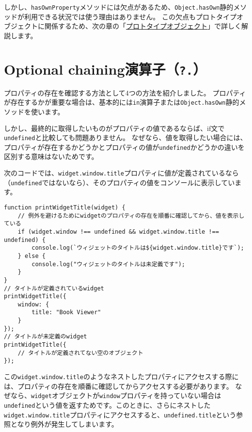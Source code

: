 しかし、\texttt{hasOwnProperty}メソッドには欠点があるため、\texttt{Object.hasOwn}静的メソッドが利用できる状況では使う理由はありません。
この欠点もプロトタイプオブジェクトに関係するため、次の章の「\hyperlink{prototype-object}{プロトタイプオブジェクト}」で詳しく解説します。

\hypertarget{optional-chaining-operator}{%
\section{Optional chaining演算子（\texttt{?.}）\,\protect{}}\label{optional-chaining-operator}}

プロパティの存在を確認する方法として4つの方法を紹介しました。
プロパティが存在するかが重要な場合は、基本的には\texttt{in}演算子または\texttt{Object.hasOwn}静的メソッドを使います。

しかし、最終的に取得したいものがプロパティの値であるならば、if文で\texttt{undefined}と比較しても問題ありません。
なぜなら、値を取得したい場合には、プロパティが存在するかどうかとプロパティの値が\texttt{undefined}かどうかの違いを区別する意味はないためです。

次のコードでは、\texttt{widget.window.title}プロパティに値が定義されているなら（\texttt{undefined}ではないなら）、そのプロパティの値をコンソールに表示しています。

\begin{lstlisting}
function printWidgetTitle(widget) {
    // 例外を避けるためにwidgetのプロパティの存在を順番に確認してから、値を表示している
    if (widget.window !== undefined && widget.window.title !== undefined) {
        console.log(`ウィジェットのタイトルは${widget.window.title}です`);
    } else {
        console.log("ウィジェットのタイトルは未定義です");
    }
}
// タイトルが定義されているwidget
printWidgetTitle({
    window: {
        title: "Book Viewer"
    }
});
// タイトルが未定義のwidget
printWidgetTitle({
    // タイトルが定義されてない空のオブジェクト
});
\end{lstlisting}

この\texttt{widget.window.title}のようなネストしたプロパティにアクセスする際には、プロパティの存在を順番に確認してからアクセスする必要があります。
なぜなら、\texttt{widget}オブジェクトが\texttt{window}プロパティを持っていない場合は\texttt{undefined}という値を返すためです。このときに、さらにネストした\texttt{widget.window.title}プロパティにアクセスすると、\texttt{undefined.title}という参照となり例外が発生してしまいます。


